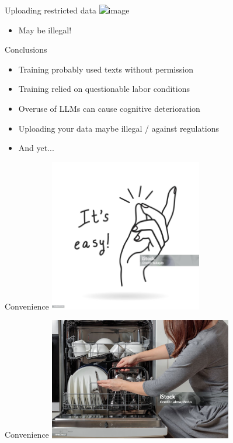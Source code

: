 \documentclass[t,xcolor={dvipsnames},final,aspectratio=169]{beamer}
\begin{document}
\begin{frame}{Uploading restricted data}
\includegraphics<+->[width=8cm]{img/llmdata.png}
\begin{itemize}
\item May be illegal!
\end{itemize}
\end{frame}

\begin{frame}{Conclusions}
\begin{itemize}
\item Training probably used texts without permission
\item Training relied on questionable labor conditions
\item Overuse of LLMs can cause cognitive deterioration
\item Uploading your data maybe illegal / against regulations
\item And yet...
\end{itemize}
\end{frame}

\begin{frame}{Convenience}
\includegraphics[width=0.5\textwidth]{img/convenient.jpg}
\end{frame}

\begin{frame}{Convenience}
\includegraphics[width=0.6\textwidth]{img/dishwasher.jpg}
\end{frame}
\end{document}
